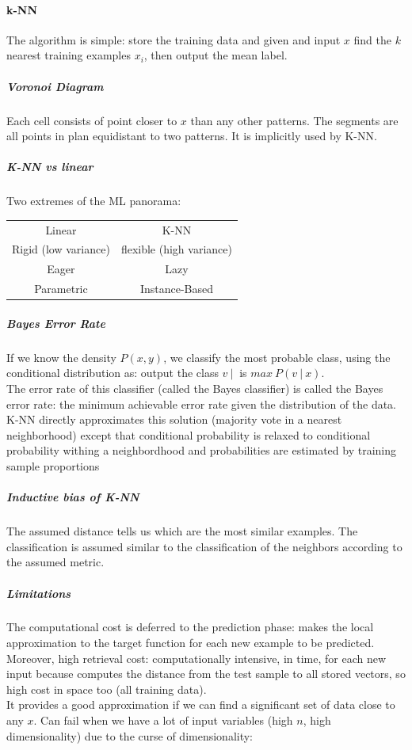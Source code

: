 \documentclass[10pt]{report}
\begin{document}
\paragraph{k-NN}
The algorithm is simple: store the training data and given and input $x$ find the $k$ nearest training examples $x_i$, then output the mean label.
\subparagraph{Voronoi Diagram} Each cell consists of point closer to $x$ than any other patterns. The segments are all points in plan equidistant to two patterns. It is implicitly used by K-NN.
\subparagraph{K-NN vs linear} Two extremes of the ML panorama:
\begin{center}
	\begin{tabular}{c c}
		Linear & K-NN\\
		Rigid (low variance) & flexible (high variance)\\
		Eager & Lazy\\
		Parametric & Instance-Based
	\end{tabular}
\end{center}
\subparagraph{Bayes Error Rate} If we know the density $P(x,y)$, we classify the most probable class, using the conditional distribution as: output the class $v\:|\:$ is $max\:P(v\:|\:x)$.\\
The error rate of this classifier (called the Bayes classifier) is called the Bayes error rate: the minimum achievable error rate given the distribution of the data. K-NN directly approximates this solution (majority vote in a nearest neighborhood) except that conditional probability is relaxed to conditional probability withing a neighbordhood and probabilities are estimated by training sample proportions
\subparagraph{Inductive bias of K-NN} The assumed distance tells us which are the most similar examples. The classification is assumed similar to the classification of the neighbors according to the assumed metric.
\subparagraph{Limitations} The computational cost is deferred to the prediction phase: makes the local approximation to the target function for each new example to be predicted.\\
Moreover, high retrieval cost: computationally intensive, in time, for each new input because computes the distance from the test sample to all stored vectors, so high cost in space too (all training data).\\
It provides a good approximation if we can find a significant set of data close to any $x$. Can fail when we have a lot of input variables (high $n$, high dimensionality) due to the curse of dimensionality:
\end{document}
